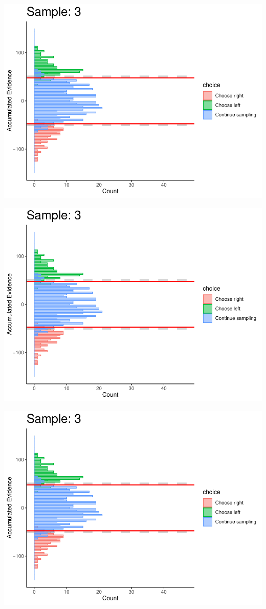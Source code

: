 \documentclass[
]{book}
\begin{document}
\begin{center}\includegraphics[width=0.8\linewidth]{LateNightBayes_files/figure-latex/fixed_dcb-22} \end{center}

\begin{center}\includegraphics[width=0.8\linewidth]{LateNightBayes_files/figure-latex/fixed_dcb-23} \end{center}

\begin{center}\includegraphics[width=0.8\linewidth]{LateNightBayes_files/figure-latex/fixed_dcb-24} \end{center}
\end{document}
